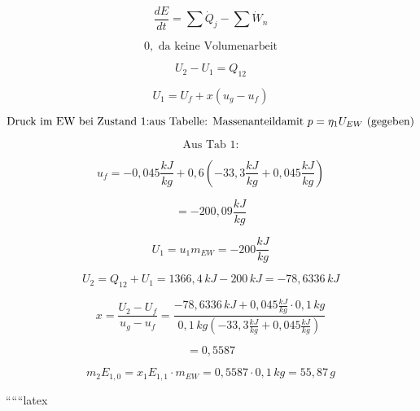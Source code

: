 \[
\frac{dE}{dt} = \sum \dot{Q}_j - \sum \dot{W}_n
\]

\[
0, \text{ da keine Volumenarbeit}
\]

\[
U_2 - U_1 = Q_{12}
\]

\[
U_1 = U_f + x (u_g - u_f)
\]

\[
\text{Druck im EW bei Zustand 1:} \\
\text{aus Tabelle: Massenanteil} \\
\text{damit } p = \eta_1 U_{EW} \text{ (gegeben)}
\]

\[
\text{Aus Tab 1:}
\]

\[
u_f = -0,045 \frac{kJ}{kg} + 0,6 \left( -33,3 \frac{kJ}{kg} + 0,045 \frac{kJ}{kg} \right)
\]

\[
= -200,09 \frac{kJ}{kg}
\]

\[
U_1 = u_1 m_{EW} = -200 \frac{kJ}{kg}
\]

\[
U_2 = Q_{12} + U_1 = 1366,4 \, kJ - 200 \, kJ = -78,6336 \, kJ
\]

\[
x = \frac{U_2 - U_f}{u_g - u_f} = \frac{-78,6336 \, kJ + 0,045 \frac{kJ}{kg} \cdot 0,1 \, kg}{0,1 \, kg \left( -33,3 \frac{kJ}{kg} + 0,045 \frac{kJ}{kg} \right)}
\]

\[
= 0,5587
\]

\[
m_2 E_{1,0} = x_1 E_{1,1} \cdot m_{EW} = 0,5587 \cdot 0,1 \, kg = 55,87 \, g
\]

``````latex


